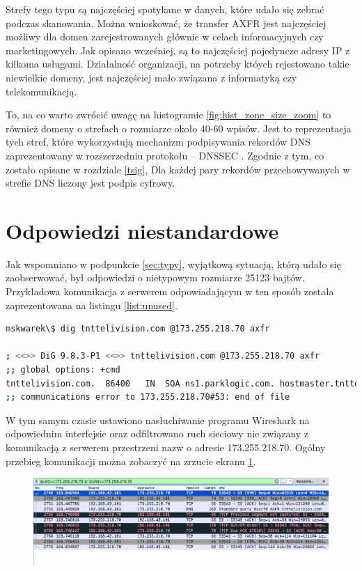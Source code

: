 Strefy tego typu są najczęściej spotykane w danych, które udało się zebrać podczas skanowania. Można wnioskować, że transfer AXFR
jest najczęściej możliwy dla domen zarejestrowanych głównie w celach informacyjnych czy marketingowych. Jak opisano wcześniej, są
to najczęściej pojedyncze adresy IP z kilkoma usługami. Działalność organizacji, na potrzeby któych rejestowano takie niewielkie
domeny, jest najczęściej mało związana z informatyką czy telekomunikacją.

To, na co warto zwrócić uwagę na histogramie \ref{fig:hist_zone_size_zoom} to również domeny o strefach o rozmiarze około 40-60 wpisów.
Jest to reprezentacja tych stref, które wykorzystują mechanizm podpisywania rekordów DNS zaprezentowany w rozszerzedniu
protokołu -- DNSSEC \cite{RFC4034, RFC4035}. Zgodnie z tym, co zostało opisane w rozdziale \ref{tsig}, Dla każdej pary rekordów
przechowywanych w strefie DNS liczony jest podpis cyfrowy.

\section{Odpowiedzi niestandardowe}
Jak wspomniano w podpunkcie \ref{sec:typy}, wyjątkową sytuacją, którą udało się zaobserwować, był odpowiedzi o nietypowym
rozmiarze 25123 bajtów. Przykładowa komunikacja z serwerem odpowiadającym w ten sposób została zaprezentowana na listingu
\ref{list:unused}.

\begin{lstlisting}[label={list:unused},captionpos=b,caption=Przykładowy odpowiedź serwera.,language=bash]
mskwarek\$ dig tnttelivision.com @173.255.218.70 axfr

; <<>> DiG 9.8.3-P1 <<>> tnttelivision.com @173.255.218.70 axfr
;; global options: +cmd
tnttelivision.com.	86400	IN	SOA	ns1.parklogic.com. hostmaster.tnttelivision.com. 2017061500 16384 2048 1048576 2560
;; communications error to 173.255.218.70#53: end of file
\end{lstlisting}

W tym samym czasie ustawiono nasłuchiwanie programu Wireshark \cite{wireshark} na odpowiednim interfejsie oraz odfiltrowano ruch sieciowy
nie związany z komunikacją z serwerem przestrzeni nazw o adresie 173.255.218.70. Ogólny przebieg komunikacji można zobaczyć na
zrzucie ekranu \ref{fig:unused_wireshark}.
\begin{figure}[ht]
\centering
\includegraphics[width=1.0\textwidth]{image/unused_wireshark}
	\caption{}
\label{fig:unused_wireshark}
\end{figure}


